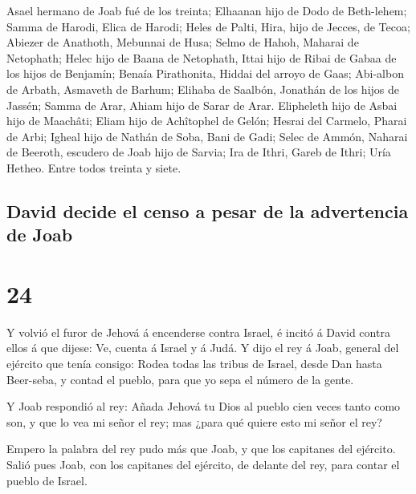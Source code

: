  Asael hermano de Joab fué de los treinta; Elhaanan hijo
de Dodo de Beth-lehem;  Samma de Harodi, Elica de Harodi;
 Heles de Palti, Hira, hijo de Jecces, de Tecoa;
 Abiezer de Anathoth, Mebunnai de Husa; 
Selmo de Hahoh, Maharai de Netophath;  Helec hijo de
Baana de Netophath, Ittai hijo de Ribai de Gabaa de los hijos de
Benjamín;  Benaía Pirathonita, Hiddai del arroyo de Gaas;
 Abi-albon de Arbath, Asmaveth de Barhum; 
Elihaba de Saalbón, Jonathán de los hijos de Jassén; 
Samma de Arar, Ahiam hijo de Sarar de Arar.  Elipheleth
hijo de Asbai hijo de Maachâti; Eliam hijo de Achîtophel de Gelón;
 Hesrai del Carmelo, Pharai de Arbi; 
Igheal hijo de Nathán de Soba, Bani de Gadi;  Selec de
Ammón, Naharai de Beeroth, escudero de Joab hijo de Sarvia;
 Ira de Ithri, Gareb de Ithri;  Uría
Hetheo. Entre todos treinta y siete.

\hypertarget{david-decide-el-censo-a-pesar-de-la-advertencia-de-joab}{%
\subsection{David decide el censo a pesar de la advertencia de
Joab}\label{david-decide-el-censo-a-pesar-de-la-advertencia-de-joab}}

\hypertarget{section-23}{%
\section{24}\label{section-23}}

 Y volvió el furor de Jehová á encenderse contra Israel, é
incitó á David contra ellos á que dijese: Ve, cuenta á Israel y á Judá.
 Y dijo el rey á Joab, general del ejército que tenía
consigo: Rodea todas las tribus de Israel, desde Dan hasta Beer-seba, y
contad el pueblo, para que yo sepa el número de la gente.

 Y Joab respondió al rey: Añada Jehová tu Dios al pueblo
cien veces tanto como son, y que lo vea mi señor el rey; mas ¿para qué
quiere esto mi señor el rey?

 Empero la palabra del rey pudo más que Joab, y que los
capitanes del ejército. Salió pues Joab, con los capitanes del ejército,
de delante del rey, para contar el pueblo de Israel.

